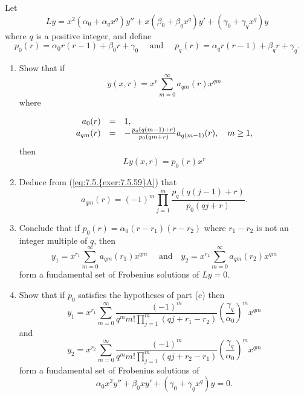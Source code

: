 \documentclass{ximera}
\begin{document}
\begin{problem}\label{exer:7.5.59}
Let
$$
Ly=x^2(\alpha_0+\alpha_qx^q)y''+x(\beta_0+\beta_qx^q)y'+
(\gamma_0+\gamma_qx^q)y
$$
where $q$ is a positive integer, and  define
$$
p_0(r)=\alpha_0r(r-1)+\beta_0r+\gamma_0\quad\mbox{ and }\quad
p_q(r)=\alpha_qr(r-1)+\beta_qr+\gamma_q.
$$
\begin{enumerate}
\item %
Show that if
$$
y(x,r)=x^{r}\sum_{m=0}^\infty a_{qm}(r)x^{qm}
$$
where

\begin{equation} \label{eq:7.5.{exer:7.5.59}A}
\begin{array}{rcl}
a_0(r)&=&1,\\
a_{qm}(r)&=&-\frac{p_q\left(q(m-1)+r\right)}{p_0(qm+r)}a_{q(m-1)}(r),\quad m\geq 1,
\end{array}
\end{equation}
then
$$
Ly(x,r)=p_0(r)x^r
$$
\item %
Deduce from (\ref{eq:7.5.{exer:7.5.59}A}) that
$$
a_{qm}(r)=(-1)^m\prod_{j=1}^m\frac{p_q\left(q(j-1)+r\right)}{ p_0(qj+r)}.
$$
\item %
Conclude that if $p_0(r)=\alpha_0(r-r_1)(r-r_2)$ where $r_1-r_2$
is not an integer multiple of $q$, then
$$
y_1=x^{r_1}\sum_{m=0}^\infty a_{qm}(r_1)x^{qm}\quad\mbox{ and
}\quad y_2=x^{r_2}\sum_{m=0}^\infty a_{qm}(r_2)x^{qm}
$$
form a fundamental set of Frobenius solutions of $Ly=0$.
\item %
Show that if $p_0$ satisfies the hypotheses of part (c) then
$$
y_1=x^{r_1}\sum_{m=0}^\infty \frac{(-1)^m}{
q^mm!\prod_{j=1}^m(qj+r_1-r_2)}
\left(\frac{\gamma_q}{\alpha_0}\right)^mx^{qm}
$$
and
$$
y_2=x^{r_2}\sum_{m=0}^\infty \frac{(-1)^m}{
q^mm!\prod_{j=1}^m(qj+r_2-r_1)}
\left(\frac{\gamma_q}{\alpha_0}\right)^mx^{qm}
$$
form a fundamental set of Frobenius solutions of
$$
\alpha_0x^2y''+\beta_0xy'+(\gamma_0+\gamma_qx^q)y=0.
$$
\end{enumerate}
\end{problem}
\end{document}
